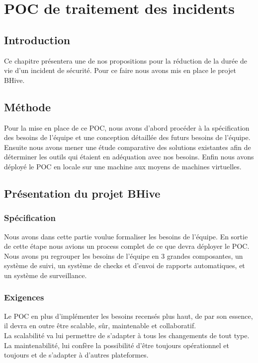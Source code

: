 \documentclass[a4paper,12pt]{book}
\theoremstyle{break}
\begin{document}
\chapter{POC de traitement des incidents}
\section*{Introduction}
Ce chapitre présentera une de nos propositions pour la réduction de la durée de vie d'un incident de sécurité. Pour ce faire nous avons mis en place le projet BHive.

\section{Méthode}
Pour la mise en place de ce POC, nous avons d'abord procéder à la spécification des besoins de l'équipe et une conception détaillée des futurs besoins de l'équipe. Ensuite nous avons mener une étude comparative des solutions existantes afin de déterminer les outils qui étaient en adéquation avec nos besoins. 
Enfin nous avons déployé le POC en locale sur une machine aux moyens de machines virtuelles. 

\section{Présentation du projet BHive}
\subsection{Spécification}
Nous avons dans cette partie voulue formaliser les besoins de l’équipe. En sortie de cette étape nous avions un process complet de ce que devra déployer le POC.
Nous avons pu regrouper les besoins de l’équipe en 3 grandes composantes, un système de suivi, un système de checks et d’envoi de rapports automatiques, et un système de surveillance.

\subsection{Exigences}
Le POC en plus d’implémenter les besoins recensés plus haut, de par son essence, il devra en outre être scalable, sûr, maintenable et collaboratif.
\\La scalabilité va lui permettre de s'adapter à tous les changements de tout type. 
\\La maintenabilité, lui confère la possibilité d'être toujours opérationnel et toujours et de s'adapter à d'autres plateformes. 
\end{document}
